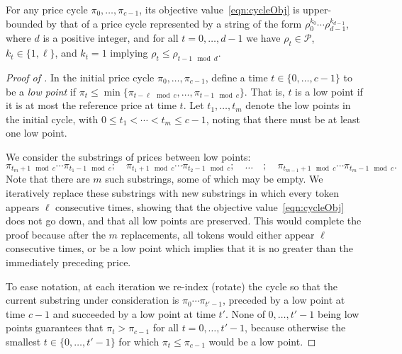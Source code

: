 \documentclass[format=acmsmall, review=false]{acmart}
\newcommand{\cP}{\mathcal{P}}
\begin{document}
\begin{lemma} \label{lem:reduction}
For any price cycle $\pi_0,\ldots,\pi_{c-1}$, its objective value~\eqref{eqn:cycleObj} is upper-bounded by that of a price cycle represented by a string of the form $\rho_0^{k_0}\cdots\rho_{d-1}^{k_{d-1}}$,
where $d$ is a positive integer, and for all $t=0,\ldots,d-1$ we have $\rho_t\in\cP$, $k_t\in\{1,\ell\}$, and $k_t=1$ implying $\rho_t\le\rho_{t-1\mod d}$.
\end{lemma}

\begin{proof}[Proof of ]
In the initial price cycle $\pi_0,\ldots,\pi_{c-1}$, define a time $t\in\{0,\ldots,c-1\}$ to be a \textit{low point} if $\pi_t\le\min\{\pi_{t-\ell\mod c},\ldots,\pi_{t-1\mod c}\}$.  That is, $t$ is a low point if it is at most the reference price at time $t$.
Let $t_1,\ldots,t_m$ denote the low points in the initial cycle, with $0\le t_1<\cdots<t_m\le c-1$, noting that there must be at least one low point.

We consider the substrings of prices between low points: $$\pi_{t_m+1\mod c}\cdots\pi_{t_1-1\mod c};\quad \pi_{t_1+1\mod c}\cdots\pi_{t_2-1\mod c};\quad \ldots \quad;\quad\pi_{t_{m-1}+1\mod c}\cdots\pi_{t_m-1\mod c}.$$  Note that there are $m$ such substrings, some of which may be empty.
We iteratively replace these substrings with new substrings in which every token appears $\ell$ consecutive times, showing that the objective value~\eqref{eqn:cycleObj} does not go down, and that all low points are preserved.
This would complete the proof because after the $m$ replacements, all tokens would either appear $\ell$ consecutive times, or be a low point which implies that it is no greater than the immediately preceding price.

To ease notation, at each iteration we re-index (rotate) the cycle so that the current substring under consideration is $\pi_0\cdots\pi_{t'-1}$, preceded by a low point at time $c-1$ and succeeded by a low point at time $t'$.  None of $0,\ldots,t'-1$ being low points guarantees that $\pi_t>\pi_{c-1}$ for all $t=0,\ldots,t'-1$, because otherwise the smallest $t\in\{0,\ldots,t'-1\}$ for which $\pi_t\le\pi_{c-1}$ would be a low point.


\end{proof}
\end{document}
